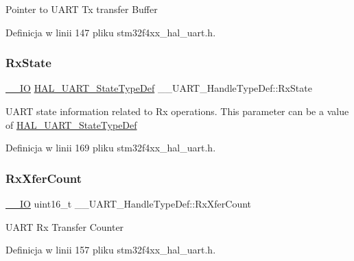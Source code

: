 Pointer to U\+A\+RT Tx transfer Buffer 

Definicja w linii 147 pliku stm32f4xx\+\_\+hal\+\_\+uart.\+h.

\mbox{\label{struct_____u_a_r_t___handle_type_def_a1b5639a73b305432afeb6aa18506d0fb}} 
\subsubsection{\texorpdfstring{Rx\+State}{RxState}}
{\footnotesize\ttfamily \hyperlink{core__sc300_8h_aec43007d9998a0a0e01faede4133d6be}{\+\_\+\+\_\+\+IO} \hyperlink{group___u_a_r_t___exported___types_gaf55d844a35379c204c90be5d1e8e50ba}{H\+A\+L\+\_\+\+U\+A\+R\+T\+\_\+\+State\+Type\+Def} \+\_\+\+\_\+\+U\+A\+R\+T\+\_\+\+Handle\+Type\+Def\+::\+Rx\+State}

U\+A\+RT state information related to Rx operations. This parameter can be a value of \hyperlink{group___u_a_r_t___exported___types_gaf55d844a35379c204c90be5d1e8e50ba}{H\+A\+L\+\_\+\+U\+A\+R\+T\+\_\+\+State\+Type\+Def} 

Definicja w linii 169 pliku stm32f4xx\+\_\+hal\+\_\+uart.\+h.

\mbox{\label{struct_____u_a_r_t___handle_type_def_a04c4b8902fadb460835b8856123453e1}} 
\subsubsection{\texorpdfstring{Rx\+Xfer\+Count}{RxXferCount}}
{\footnotesize\ttfamily \hyperlink{core__sc300_8h_aec43007d9998a0a0e01faede4133d6be}{\+\_\+\+\_\+\+IO} uint16\+\_\+t \+\_\+\+\_\+\+U\+A\+R\+T\+\_\+\+Handle\+Type\+Def\+::\+Rx\+Xfer\+Count}

U\+A\+RT Rx Transfer Counter 

Definicja w linii 157 pliku stm32f4xx\+\_\+hal\+\_\+uart.\+h.

